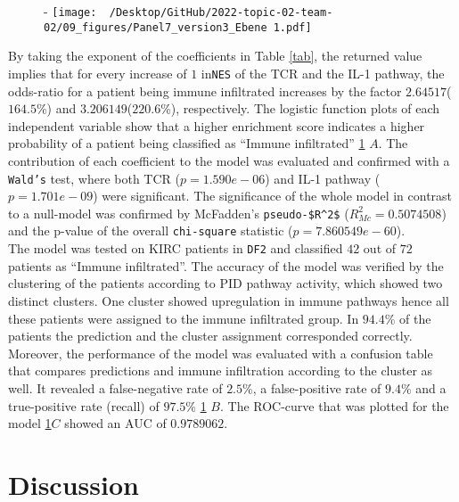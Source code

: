\documentclass[
  parskip,
  oneside]{scrreprt}
\begin{document}
\begin{figure}[h]-
  \texttt{[image: ~/Desktop/GitHub/2022-topic-02-team-02/09\_figures/Panel7\_version3\_Ebene 1.pdf]}
  \caption{}
  \label{log}
\end{figure}

By taking the exponent of the coefficients in Table \cref{tab}, the
returned value implies that for every increase of \(1\) in\texttt{NES}
of the TCR and the IL-1 pathway, the odds-ratio for a patient being
immune infiltrated increases by the factor \(2.64517\)(\(164.5\)\%) and
\(3.206149\)(\(220.6\)\%), respectively. The logistic function plots of
each independent variable show that a higher enrichment score indicates
a higher probability of a patient being classified as ``Immune
infiltrated'' \cref{log} \(A\). The contribution of each coefficient to
the model was evaluated and confirmed with a \texttt{Wald’s} test, where
both TCR (\(p= 1.590e-06\)) and IL-1 pathway (\(p= 1.701e-09\)) were
significant. The significance of the whole model in contrast to a
null-model was confirmed by McFadden's \texttt{pseudo-\$R\^{}2\$}
(\(R_{Mc}^2=0.5074508\)) and the p-value of the overall
\texttt{chi-square} statistic (\(p=7.860549e-60\)).\\
The model was tested on KIRC patients in \texttt{DF2} and classified
\(42\) out of \(72\) patients as ``Immune infiltrated''. The accuracy of
the model was verified by the clustering of the patients according to
PID pathway activity, which showed two distinct clusters. One cluster
showed upregulation in immune pathways hence all these patients were
assigned to the immune infiltrated group. In \(94.4\)\% of the patients
the prediction and the cluster assignment corresponded correctly.
Moreover, the performance of the model was evaluated with a confusion
table that compares predictions and immune infiltration according to the
cluster as well. It revealed a false-negative rate of \(2.5\)\%, a
false-positive rate of \(9.4\)\% and a true-positive rate (recall) of
\(97.5\)\% \cref{log} \(B\). The ROC-curve that was plotted for the
model \cref{log}\(C\) showed an AUC of \(0.9789062\).

\hypertarget{discussion}{%
\chapter{Discussion}\label{discussion}}
\end{document}
